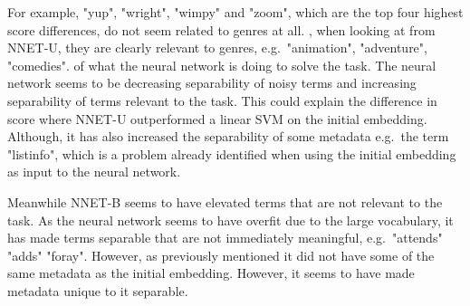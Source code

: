 For example, "yup", "wright", "wimpy" and "zoom", which are the top four highest score differences, do not seem related to genres at all. , when looking at  from NNET-U, they are clearly relevant to genres, e.g.\ "animation", "adventure", "comedies".   of what the neural network is doing to solve the task. The neural network seems to be decreasing separability of noisy terms and increasing separability of terms relevant to the task. This could explain  the difference in score where  NNET-U outperformed a linear SVM on the initial embedding. Although, it has also increased the separability of some metadata e.g.\ the term "listinfo", which is a problem already identified when using the initial embedding as input to the neural network. 

Meanwhile NNET-B seems to have elevated terms that are not relevant to the task. As the neural network seems to have overfit due to the large vocabulary, it has made terms separable that are not immediately meaningful, e.g.\ "attends" "adds" "foray". However, as previously mentioned it did  not have some of the same metadata as the initial embedding. However, it seems to have made metadata unique to it separable. 


